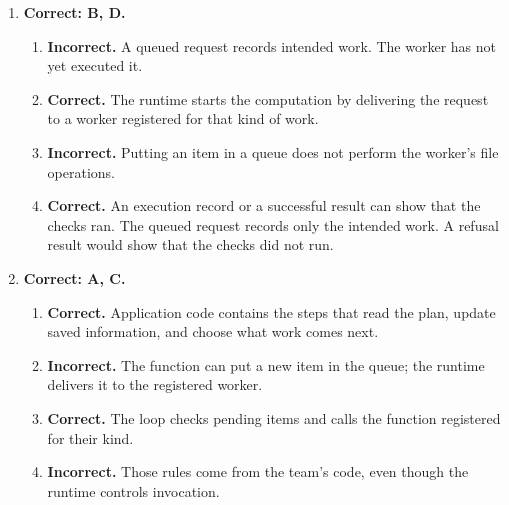 \begin{enumerate}[start=41,itemsep=0.7\baselineskip]
\item[{\hyperref[exercise:41]{41.}}] \begin{minipage}[t]{\linewidth}
\textbf{Correct: B, D.}
\begin{enumerate}[label=\textnormal{(\Alph*)},leftmargin=*,itemsep=0pt]
\item \textbf{Incorrect.} A queued request records intended work. The worker has not yet executed it.
\item \textbf{Correct.} The runtime starts the computation by delivering the request to a worker registered for that kind of work.
\item \textbf{Incorrect.} Putting an item in a queue does not perform the worker's file operations.
\item \textbf{Correct.} An execution record or a successful result can show that the checks ran. The queued request records only the intended work. A refusal result would show that the checks did not run.
\end{enumerate}
\end{minipage}

\item[{\hyperref[exercise:42]{42.}}] \begin{minipage}[t]{\linewidth}
\textbf{Correct: A, C.}
\begin{enumerate}[label=\textnormal{(\Alph*)},leftmargin=*,itemsep=0pt]
\item \textbf{Correct.} Application code contains the steps that read the plan, update saved information, and choose what work comes next.
\item \textbf{Incorrect.} The function can put a new item in the queue; the runtime delivers it to the registered worker.
\item \textbf{Correct.} The loop checks pending items and calls the function registered for their kind.
\item \textbf{Incorrect.} Those rules come from the team's code, even though the runtime controls invocation.
\end{enumerate}
\end{minipage}


\end{enumerate}
